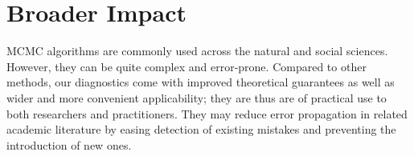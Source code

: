 \documentclass{article}
\begin{document}
\section{Broader Impact}
\label{sec:impact}
MCMC algorithms are commonly used across the natural and social sciences. However, they can be quite complex and error-prone. Compared to other methods, our diagnostics come with improved theoretical guarantees as well as wider and more convenient applicability; they are thus are of practical use to both researchers and practitioners. They may reduce error propagation in related academic literature by easing detection of existing mistakes and preventing the introduction of new ones.







\end{document}
